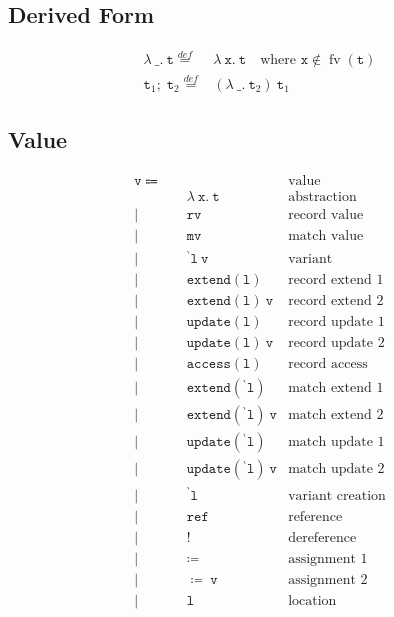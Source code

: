 \documentclass{report}
\newcommand{\code}{\mathtt}
\newcommand{\backtick}{{}^{\backprime}}
\DeclareMathOperator{\freeVariable}{fv}
\newcommand{\definedAs}{\stackrel{def}{=}}
\newcommand{\sequencing}{;\;}
\begin{document}
\subsection{Derived Form}

\begin{align*}
\lambda\ \_ .\ \code{t} \definedAs & \lambda\ \code{x}.\ \code{t} \quad \text{where \(\code{x} \not\in \freeVariable(\code{t})\)} \\
\code{t}_1\sequencing\code{t}_2 \definedAs & (\lambda\ \_ .\ \code{t}_2)\ \code{t}_1
\end{align*}

\subsection{Value}

\begin{align*}
\code{v} \Coloneqq \quad & & \text{value} \\
& \code{\lambda\ x.\ t} & \text{abstraction} \\
| \quad & \code{rv} & \text{record value} \\
| \quad & \code{mv} & \text{match value} \\
| \quad & \code{\backtick l\ v} & \text{variant} \\
| \quad & \code{extend(l)} & \text{record extend 1} \\
| \quad & \code{extend(l)\ v} & \text{record extend 2} \\
| \quad & \code{update(l)} & \text{record update 1} \\
| \quad & \code{update(l)\ v} & \text{record update 2} \\
| \quad & \code{access(l)} & \text{record access} \\
| \quad & \code{extend(\backtick l)} & \text{match extend 1} \\
| \quad & \code{extend(\backtick l)\ v} & \text{match extend 2} \\
| \quad & \code{update(\backtick l)} & \text{match update 1} \\
| \quad & \code{update(\backtick l)\ v} & \text{match update 2} \\
| \quad & \code{\backtick l} & \text{variant creation} \\
| \quad & \code{ref} & \text{reference} \\
| \quad & \code{!} & \text{dereference} \\
| \quad & \code{\coloneqq} & \text{assignment 1} \\
| \quad & \code{\coloneqq\ v} & \text{assignment 2} \\
| \quad & \code{l} & \text{location}
\end{align*}
\end{document}
